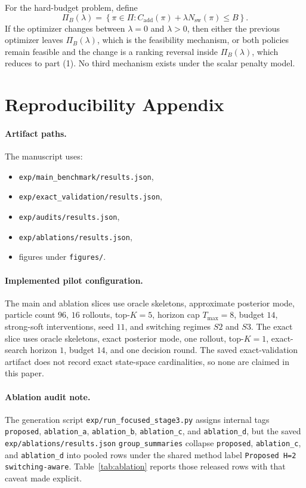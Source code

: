 \documentclass[10pt]{article}
\newcommand{\Nsw}{N_{\mathrm{sw}}}
\begin{document}
For the hard-budget problem, define
\begin{equation}
\Pi_B(\lambda)=\left\{\pi\in\Pi:
C_{\mathrm{add}}(\pi)+\lambda\Nsw(\pi)\le B
\right\}.
\end{equation}
If the optimizer changes between $\lambda=0$ and $\lambda>0$, then either the previous optimizer leaves $\Pi_B(\lambda)$, which is the feasibility mechanism, or both policies remain feasible and the change is a ranking reversal inside $\Pi_B(\lambda)$, which reduces to part (1). No third mechanism exists under the scalar penalty model.

\section{Reproducibility Appendix}
\paragraph{Artifact paths.}
The manuscript uses:
\begin{itemize}[leftmargin=1.1em]
  \item \texttt{exp/main\_benchmark/results.json},
  \item \texttt{exp/exact\_validation/results.json},
  \item \texttt{exp/audits/results.json},
  \item \texttt{exp/ablations/results.json},
  \item figures under \texttt{figures/}.
\end{itemize}

\paragraph{Implemented pilot configuration.}
The main and ablation slices use oracle skeletons, approximate posterior mode, particle count $96$, $16$ rollouts, top-$K=5$, horizon cap $T_{\max}=8$, budget $14$, strong-soft interventions, seed $11$, and switching regimes $S2$ and $S3$. The exact slice uses oracle skeletons, exact posterior mode, one rollout, top-$K=1$, exact-search horizon $1$, budget $14$, and one decision round. The saved exact-validation artifact does not record exact state-space cardinalities, so none are claimed in this paper.

\paragraph{Ablation audit note.}
The generation script \texttt{exp/run\_focused\_stage3.py} assigns internal tags \texttt{proposed}, \texttt{ablation\_a}, \texttt{ablation\_b}, \texttt{ablation\_c}, and \texttt{ablation\_d}, but the saved \texttt{exp/ablations/results.json} \texttt{group\_summaries} collapse \texttt{proposed}, \texttt{ablation\_c}, and \texttt{ablation\_d} into pooled rows under the shared method label \texttt{Proposed H=2 switching-aware}. Table~\ref{tab:ablation} reports those released rows with that caveat made explicit.
\end{document}
